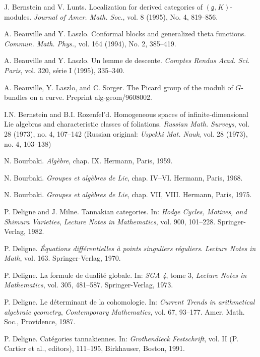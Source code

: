 \begin{description}[leftmargin=3.2em,itemsep=2pt]
\item[{[BL]}] J. Bernstein and V. Lunts. Localization for derived categories of $(\mathfrak{g},K)$-modules. \emph{Journal of Amer. Math. Soc.}, vol. 8 (1995), No. 4, 819--856.
\item[{[BLa94]}] A. Beauville and Y. Laszlo. Conformal blocks and generalized theta functions. \emph{Commun. Math. Phys.}, vol. 164 (1994), No. 2, 385--419.
\item[{[BLa95]}] A. Beauville and Y. Laszlo. Un lemme de descente. \emph{Comptes Rendus Acad. Sci. Paris}, vol. 320, série I (1995), 335--340.
\item[{[BLaSo]}] A. Beauville, Y. Laszlo, and C. Sorger. The Picard group of the moduli of $G$-bundles on a curve. Preprint alg-geom/9608002.
\item[{[BR]}] I.N. Bernstein and B.I. Rozenfel'd. Homogeneous spaces of infinite-dimensional Lie algebras and characteristic classes of foliations. \emph{Russian Math. Surveys}, vol. 28 (1973), no. 4, 107--142 (Russian original: \emph{Uspekhi Mat. Nauk}, vol. 28 (1973), no. 4, 103--138)
\item[{[Bourb59]}] N. Bourbaki. \emph{Algèbre}, chap. IX. Hermann, Paris, 1959.
\item[{[Bour68]}] N. Bourbaki. \emph{Groupes et algèbres de Lie}, chap. IV--VI. Hermann, Paris, 1968.
\item[{[Bour75]}] N. Bourbaki. \emph{Groupes et algèbres de Lie}, chap. VII, VIII. Hermann, Paris, 1975.
\item[{[De-Mi]}] P. Deligne and J. Milne. Tannakian categories. In: \emph{Hodge Cycles, Motives, and Shimura Varieties}, \emph{Lecture Notes in Mathematics}, vol. 900, 101--228. Springer-Verlag, 1982.
\item[{[Del70]}] P. Deligne. \emph{Équations différentielles à points singuliers réguliers}. \emph{Lecture Notes in Math}, vol. 163. Springer-Verlag, 1970.
\item[{[Del73]}] P. Deligne. La formule de dualité globale. In: \emph{SGA 4}, tome 3, \emph{Lecture Notes in Mathematics}, vol. 305, 481--587. Springer-Verlag, 1973.
\item[{[Del87]}] P. Deligne. Le déterminant de la cohomologie. In: \emph{Current Trends in arithmetical algebraic geometry}, \emph{Contemporary Mathematics}, vol. 67, 93--177. Amer. Math. Soc., Providence, 1987.
\item[{[Del91]}] P. Deligne. Catégories tannakiennes. In: \emph{Grothendieck Festschrift}, vol. II (P. Cartier et al., editors), 111--195, Birkhauser, Boston, 1991.

\end{description}
